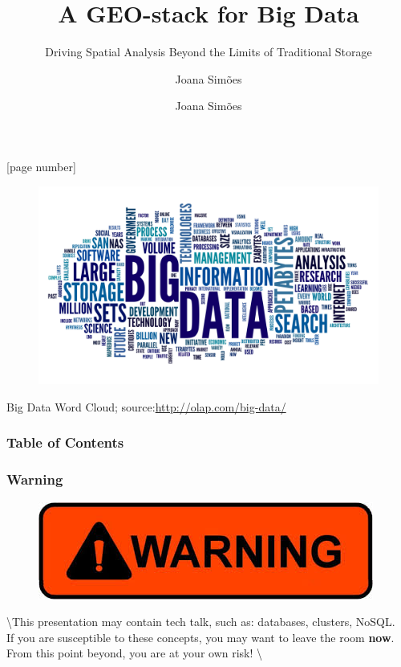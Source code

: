 \documentclass[hyperref={pdfpagelabels=true}]{beamer}
\title{A GEO-stack for Big Data}
\subtitle{ Driving Spatial Analysis Beyond the Limits of
Traditional Storage}
\author{Joana Sim\~{o}es}
\author[shortname]{Joana Sim\~{o}es \inst{1}}
\institute[shortinst]{\inst{1} BDigital, CASA, CICS.NOVA}
\begin{document}
[page number]
\begin{frame}
\titlepage


\end{frame} 
 
\begin{frame}
\begin{figure}
  \includegraphics[width=\textwidth]{wordcloud.jpg}
\end{figure}
\tiny{Big Data Word Cloud; source:\url{http://olap.com/big-data/}}
\end{frame} 
 
 
\begin{frame}
\frametitle{Table of Contents}
\tableofcontents%
\end{frame}

\begin{frame}
\frametitle{Warning}
\begin{figure}
  \includegraphics[scale=0.40]{warning.jpeg}
\end{figure}
\textbackslash *
This presentation may contain tech talk, such as: databases, clusters, NoSQL.\\
If you are susceptible to these concepts, you may want to leave the room \textbf{now}.\\
From this point beyond, you are at your own risk!
\textbackslash *
\end{frame}
\end{document}
